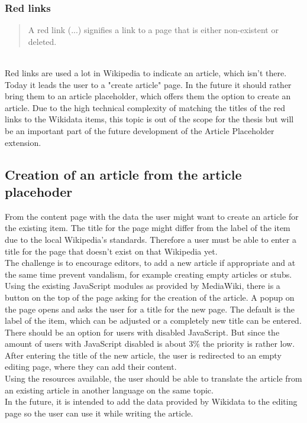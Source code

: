 \documentclass[11pt]{article}
\begin{document}
\subsubsection{Red links}
\begin{quotation}
A red link (...) signifies a link to a page that is either non-existent or deleted. 
\end{quotation} \cite{wiki:01} %
\\
Red links are used a lot in Wikipedia to indicate an article, which isn't there. Today it leads the user to a "create article" page. In the future it should rather bring them to an article placeholder, which offers them the option to create an article. Due to the high technical complexity of matching the titles of the red links to the Wikidata items, this topic is out of the scope for the thesis but will be an important part of the future development of the Article Placeholder extension.

\subsection{Creation of an article from the article placehoder}
From the content page with the data the user might want to create an article for the existing item. The title for the page might differ from the label of the item due to the local Wikipedia's standards. Therefore a user must be able to enter a title for the page that doesn't exist on that Wikipedia yet. \\
The challenge is to encourage editors, to add a new article if appropriate and at the same time prevent vandalism, for example creating empty articles or stubs.\\
Using the existing JavaScript modules as provided by MediaWiki, there is a button on the top of the page asking for the creation of the article. A popup on the page opens and asks the user for a title for the new page. The default is the label of the item, which can be adjusted or a completely new title can be entered. \\
There should be an option for users with disabled JavaScript. But since the amount of users with JavaScript disabled is about 3\% %
the priority is rather low. \\
After entering the title of the new article, the user is redirected to an empty editing page, where they can add their content. \\
Using the resources available, the user should be able to translate the article from an existing article in another language on the same topic. \\
In the future, it is intended to add the data provided by Wikidata to the editing page so the user can use it while writing the article. 
\end{document}

